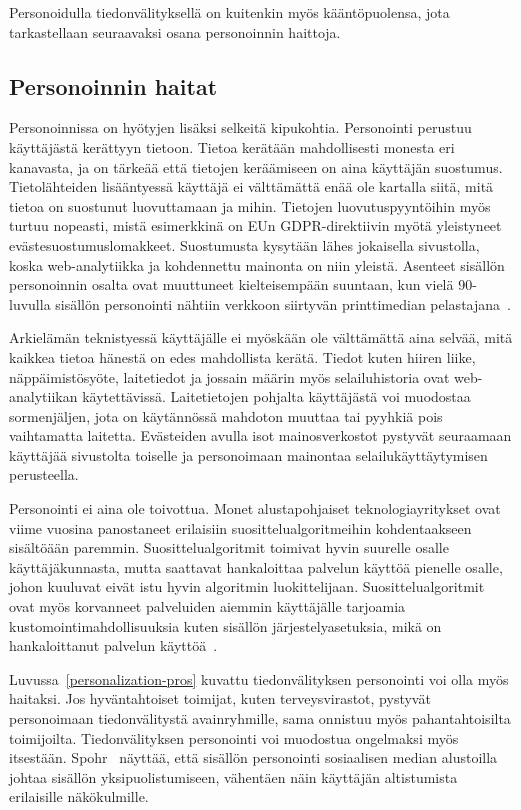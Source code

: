 \documentclass[finnish, 12pt, a4paper, elec, utf8, a-1b, online]{aaltothesis}
\begin{document}
Personoidulla tiedonvälityksellä on kuitenkin myös kääntöpuolensa, jota
tarkastellaan seuraavaksi osana personoinnin haittoja.

\subsection{Personoinnin haitat}\label{personalization-cons}

Personoinnissa on hyötyjen lisäksi selkeitä kipukohtia. Personointi perustuu
käyttäjästä kerättyyn tietoon. Tietoa kerätään mahdollisesti monesta eri
kanavasta, ja on tärkeää että tietojen keräämiseen on aina käyttäjän suostumus.
Tietolähteiden lisääntyessä käyttäjä ei välttämättä enää ole kartalla siitä,
mitä tietoa on suostunut luovuttamaan ja mihin. Tietojen luovutuspyyntöihin myös
turtuu nopeasti, mistä esimerkkinä on EUn GDPR-direktiivin myötä yleistyneet
evästesuostumuslomakkeet. Suostumusta kysytään lähes jokaisella sivustolla,
koska web-analytiikka ja kohdennettu mainonta on niin yleistä. Asenteet sisällön
personoinnin osalta ovat muuttuneet kielteisempään suuntaan, kun vielä
90-luvulla sisällön personointi nähtiin verkkoon siirtyvän printtimedian
pelastajana~\cite{adams_1995}.

Arkielämän teknistyessä käyttäjälle ei myöskään ole välttämättä aina selvää,
mitä kaikkea tietoa hänestä on edes mahdollista kerätä. Tiedot kuten hiiren
liike, näppäimistösyöte, laitetiedot ja jossain määrin myös selailuhistoria ovat
web-analytiikan käytettävissä. Laitetietojen pohjalta käyttäjästä voi muodostaa
sormenjäljen, jota on käytännössä mahdoton muuttaa tai pyyhkiä pois vaihtamatta
laitetta. Evästeiden avulla isot mainosverkostot pystyvät seuraamaan käyttäjää
sivustolta toiselle ja personoimaan mainontaa selailukäyttäytymisen perusteella.

Personointi ei aina ole toivottua. Monet alustapohjaiset teknologiayritykset
ovat viime vuosina panostaneet erilaisiin suosittelualgoritmeihin kohdentaakseen
sisältöään paremmin. Suosittelualgoritmit toimivat hyvin suurelle osalle
käyttäjäkunnasta, mutta saattavat hankaloittaa palvelun käyttöä pienelle osalle,
johon kuuluvat eivät istu hyvin algoritmin luokittelijaan. Suosittelualgoritmit
ovat myös korvanneet palveluiden aiemmin käyttäjälle tarjoamia
kustomointimahdollisuuksia kuten sisällön järjestelyasetuksia, mikä on
hankaloittanut palvelun käyttöä~\cite{patel_2022}.

Luvussa~\ref{personalization-pros} kuvattu tiedonvälityksen personointi voi olla
myös haitaksi. Jos hyväntahtoiset toimijat, kuten terveysvirastot, pystyvät
personoimaan tiedonvälitystä avainryhmille, sama onnistuu myös pahantahtoisilta
toimijoilta. Tiedonvälityksen personointi voi muodostua ongelmaksi myös
itsestään. Spohr~\cite{doi:10.1177/0266382117722446} näyttää, että sisällön
personointi sosiaalisen median alustoilla johtaa sisällön yksipuolistumiseen,
vähentäen näin käyttäjän altistumista erilaisille näkökulmille.
\end{document}
